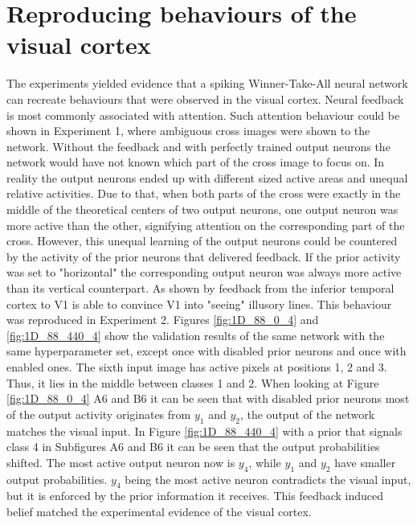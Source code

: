 \section{Reproducing behaviours of the visual cortex}
The experiments yielded evidence that a spiking Winner-Take-All neural network can recreate behaviours that were observed in the visual cortex. Neural feedback is most commonly associated with attention. Such attention behaviour could be shown in Experiment 1, where ambiguous cross images were shown to the network. Without the feedback and with perfectly trained output neurons the network would have not known which part of the cross image to focus on. In reality the output neurons ended up with different sized active areas and unequal relative activities. Due to that, when both parts of the cross were exactly in the middle of the theoretical centers of two output neurons, one output neuron was more active than the other, signifying attention on the corresponding part of the cross. However, this unequal learning of the output neurons could be countered by the activity of the prior neurons that delivered feedback. If the prior activity was set to "horizontal" the corresponding output neuron was always more active than its vertical counterpart. 
As shown by \citet{HierachicalBayesVisualCortex} feedback from the inferior temporal cortex to V1 is able to convince V1 into "seeing" illusory lines. This behaviour was reproduced in Experiment 2. Figures \ref{fig:1D_88_0_4} and \ref{fig:1D_88_440_4} show the validation results of the same network with the same hyperparameter set, except once with disabled prior neurons and once with enabled ones. The sixth input image has active pixels at positions 1, 2 and 3. Thus, it lies in the middle between classes 1 and 2. When looking at Figure \ref{fig:1D_88_0_4} A6 and B6 it can be seen that with disabled prior neurons most of the output activity originates from $y_1$ and $y_2$, the output of the network  matches the visual input. In Figure \ref{fig:1D_88_440_4} with a prior that signals class 4 in Subfigures A6 and B6 it can be seen that the output probabilities shifted. The most active output neuron now is $y_4$, while $y_1$ and $y_2$ have smaller output probabilities. $y_4$ being the most active neuron contradicts the visual input, but it is enforced by the prior information it receives. This feedback induced belief matched the experimental evidence of the visual cortex.

